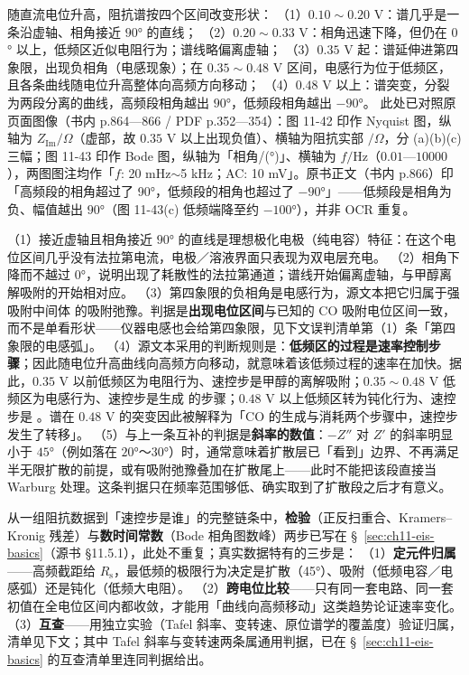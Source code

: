 \begin{obs}
随直流电位升高，阻抗谱按四个区间改变形状：
（1）$0.10\sim0.20$ V：谱几乎是一条沿虚轴、相角接近 $90$° 的直线；
（2）$0.20\sim0.33$ V：相角迅速下降，但仍在 $0$° 以上，低频区近似电阻行为；谱线略偏离虚轴；
（3）$0.35$ V 起：谱延伸进第四象限，出现负相角（电感现象）；在 $0.35\sim0.48$ V 区间，电感行为位于低频区，且各条曲线随电位升高整体向高频方向移动；
（4）$0.48$ V 以上：谱突变，分裂为两段分离的曲线，高频段相角越出 $90$°，低频段相角越出 $-90$°。
此处已对照原页面图像（书内 p.864—866 / PDF p.352—354）：图 11-42 印作 Nyquist 图，纵轴为 $Z_{\mathrm{Im}}/\Omega$（虚部，故 $0.35$ V 以上出现负值）、横轴为阻抗实部 $/\Omega$，分 (a)(b)(c) 三幅；图 11-43 印作 Bode 图，纵轴为「相角/(°)」、横轴为 $f/\mathrm{Hz}$（$0.01$—$10000$），两图图注均作「$f$: 20 mHz$\sim$5 kHz；AC: 10 mV」。原书正文（书内 p.866）印「高频段的相角超过了 90°，低频段的相角也超过了 $-90$°」——低频段是相角为负、幅值越出 $90$°（图 11-43(c) 低频端降至约 $-100$°），并非 OCR 重复。
\end{obs}

\begin{infer}
（1）接近虚轴且相角接近 $90$° 的直线是理想极化电极（纯电容）特征：在这个电位区间几乎没有法拉第电流，电极／溶液界面只表现为双电层充电。
（2）相角下降而不越过 $0$°，说明出现了耗散性的法拉第通道；谱线开始偏离虚轴，与甲醇离解吸附的开始相对应。
（3）第四象限的负相角是电感行为，源文本把它归属于强吸附中间体  的吸附弛豫。判据是\textbf{出现电位区间}与已知的 CO 吸附电位区间一致，而不是单看形状——仪器电感也会给第四象限，见下文误判清单第（1）条「第四象限的电感弧」。
（4）源文本采用的判断规则是：\textbf{低频区的过程是速率控制步骤}；因此随电位升高曲线向高频方向移动，就意味着该低频过程的速率在加快。据此，$0.35$ V 以前低频区为电阻行为、速控步是甲醇的离解吸附；$0.35\sim0.48$ V 低频区为电感行为、速控步是生成  的步骤；$0.48$ V 以上低频区转为钝化行为、速控步是 。谱在 $0.48$ V 的突变因此被解释为「CO 的生成与消耗两个步骤中，速控步发生了转移」。
（5）与上一条互补的判据是\textbf{斜率的数值}：$-Z''$ 对 $Z'$ 的斜率明显小于 $45$°（例如落在 $20$°～$30$°）时，通常意味着扩散层已「看到」边界、不再满足半无限扩散的前提，或有吸附弛豫叠加在扩散尾上——此时不能把该段直接当 Warburg 处理。这条判据只在频率范围够低、确实取到了扩散段之后才有意义。
\end{infer}

\begin{dataflow}
从一组阻抗数据到「速控步是谁」的完整链条中，\textbf{检验}（正反扫重合、Kramers--Kronig 残差）与\textbf{数时间常数}（Bode 相角图数峰）两步已写在 §~\ref{sec:ch11-eis-basics}（源书 §11.5.1），此处不重复；真实数据特有的三步是：
（1）\textbf{定元件归属}——高频截距给 $R_{\mathrm{s}}$，最低频的极限行为决定是扩散（45°）、吸附（低频电容／电感弧）还是钝化（低频大电阻）。
（2）\textbf{跨电位比较}——只有同一套电路、同一套初值在全电位区间内都收敛，才能用「曲线向高频移动」这类趋势论证速率变化。
（3）\textbf{互查}——用独立实验（Tafel 斜率、变转速、原位谱学的覆盖度）验证归属，清单见下文；其中 Tafel 斜率与变转速两条属通用判据，已在 §~\ref{sec:ch11-eis-basics} 的互查清单里连同判据给出。
\end{dataflow}

